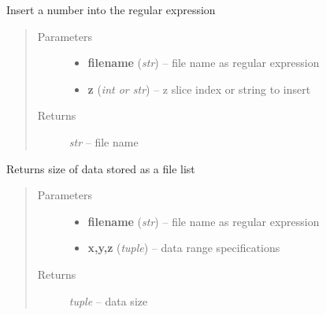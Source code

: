 \documentclass[letterpaper,10pt,english]{sphinxmanual}
\begin{document}
\begin{fulllineitems}
\label{api/ClearMap.IO:ClearMap.IO.FileList.fileExpressionToFileName}
Insert a number into the regular expression
\begin{quote}\begin{description}
\item[{Parameters}] \leavevmode\begin{itemize}
\item {} 
\textbf{filename} (\emph{str}) --
file name as regular expression

\item {} 
\textbf{z} (\emph{int or str}) --
z slice index or string to insert

\end{itemize}

\item[{Returns}] \leavevmode
\emph{str} --
file name

\end{description}\end{quote}

\end{fulllineitems}


\begin{fulllineitems}
\label{api/ClearMap.IO:ClearMap.IO.FileList.dataSize}
Returns size of data stored as a file list
\begin{quote}\begin{description}
\item[{Parameters}] \leavevmode\begin{itemize}
\item {} 
\textbf{filename} (\emph{str}) --
file name as regular expression

\item {} 
\textbf{x,y,z} (\emph{tuple}) --
data range specifications

\end{itemize}

\item[{Returns}] \leavevmode
\emph{tuple} --
data size

\end{description}\end{quote}

\end{fulllineitems}
\end{document}
